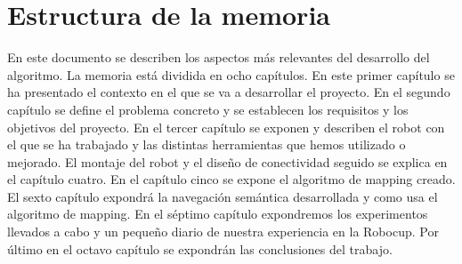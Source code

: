 \section{Estructura de la memoria}
\label{cap:estructuradelamemoria}
En este documento se describen los aspectos más relevantes del desarrollo del algoritmo. La memoria está dividida en ocho capítulos. En este primer capítulo se ha presentado el contexto en el que se va a desarrollar el proyecto. En el segundo capítulo se define el problema concreto y se establecen los requisitos y los objetivos del proyecto. En el tercer capítulo se exponen y describen el robot con el que se ha trabajado y las distintas herramientas que hemos utilizado o mejorado. El montaje del robot y el diseño de conectividad seguido se explica en el capítulo cuatro. En el capítulo cinco se expone el algoritmo de mapping creado. El sexto capítulo expondrá la navegación semántica desarrollada y como usa el algoritmo de mapping. En el séptimo capítulo expondremos los experimentos llevados a cabo y un pequeño diario de nuestra experiencia en la Robocup. Por último en el octavo capítulo se expondrán las conclusiones del trabajo.
